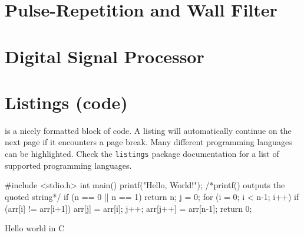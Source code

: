 \section{Pulse-Repetition and Wall Filter}
\section{Digital Signal Processor}

\section{Listings (code)}

 is a nicely formatted block of code. A listing will automatically continue on the next page if it encounters a page break. Many different programming languages can be highlighted. Check the \texttt{listings} package documentation for a list of supported programming languages.

\begin{listing}[htbp]
\begin{mintedc}
#include <stdio.h>
int main()
{
	printf("Hello, World!"); /*printf() outputs the quoted string*/
	if (n == 0 || n == 1){
		return n;
	}
	j = 0;
	for (i = 0; i < n-1; i++){
		if (arr[i] != arr[i+1]){
			arr[j] = arr[i];
			j++;
		}
	}
	arr[j++] = arr[n-1];
	return 0;
}
\end{mintedc}
	\caption{Hello world in C}
	\label{lst:helloworld}
\end{listing}



